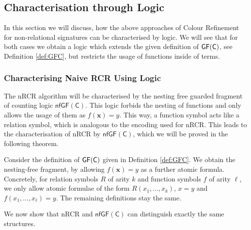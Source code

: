\subsection{Characterisation through Logic}
\label{sec:RCRwithFnLogic}

In this section we will discuss, how the above approaches of Colour Refinement for non-relational signatures can be characterised by logic.
We will see that for both cases we obtain a logic which extends the given definition of $\mathsf{GF}(\mathsf{C})$, see Definition \ref{def:GFC}, but restricts the usage of functions inside of terms.

\subsubsection{Characterising Naive RCR Using Logic} 

The nRCR algorithm will be characterised by the nesting free guarded fragment of counting logic $\mathsf{nfGF}(\mathsf C)$.
This logic forbids the nesting of functions and only allows the usage of them as $f(\mathbf x)=y$.
This way, a function symbol acts like a relation symbol, which is analogous to the encoding used for nRCR. 
This leads to the characterisation of nRCR by $\mathsf{nfGF}(\mathsf C)$, which we will be proved in the following theorem.

\begin{definition}
	Consider the definition of $\mathsf{GF}(\mathsf{C})$ given in Definition \ref{def:GFC}.
	We obtain the nesting-free fragment, by allowing $f(\mathbf x)=y$ as a further atomic formula.
	Concretely, for relation symbols $R$ of arity $k$ and function symbols $f$ of arity $\ell$, we only allow atomic formulae of the form $R(x_1,\dots,x_k)$, $x=y$ and $f(x_1,\dots,x_\ell)=y$.
	The remaining definitions stay the same.
\end{definition}

We now show that nRCR and $\mathsf{nfGF}(\mathsf C)$ can distinguish exactly the same structures.

